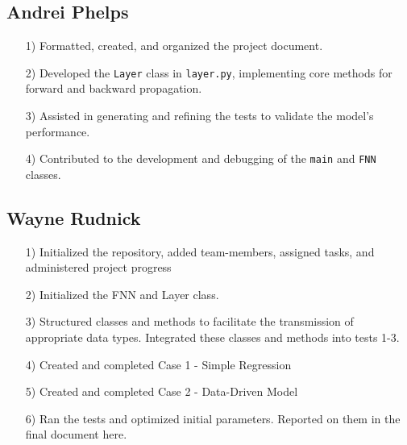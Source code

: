 \documentclass{article}
\begin{document}
\subsection{Andrei Phelps}
\begin{itemize}
    \item[1)] Formatted, created, and organized the project document.
    \item[2)] Developed the \texttt{Layer} class in \texttt{layer.py}, implementing core methods for forward and backward propagation.
    \item[3)] Assisted in generating and refining the tests to validate the model's performance.
    \item[4)] Contributed to the development and debugging of the \texttt{main} and \texttt{FNN} classes.
\end{itemize}

\subsection{Wayne Rudnick}
\begin{itemize}
    \item[1)] Initialized the repository, added team-members, assigned tasks, and administered project progress
    \item[2)] Initialized the FNN and Layer class.
    \item[3)] Structured classes and methods to facilitate the transmission of appropriate data types. Integrated these classes and methods into tests 1-3.
    \item[4)] Created and completed Case 1 - Simple Regression
    \item[5)] Created and completed Case 2 - Data-Driven Model
    \item[6)] Ran the tests and optimized initial parameters. Reported on them in the final document here.
\end{itemize}
\end{document}
